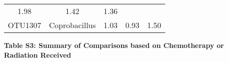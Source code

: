 \documentclass[12pt,]{article}
\begin{document}
\begin{longtable}[]{@{}ccccc@{}}
\begin{minipage}[t]{0.17\columnwidth}
1.98\strut
\end{minipage} & \begin{minipage}[t]{0.25\columnwidth}\centering\strut
1.42\strut
\end{minipage} & \begin{minipage}[t]{0.19\columnwidth}\centering\strut
1.36\strut
\end{minipage}\tabularnewline
\begin{minipage}[t]{0.07\columnwidth}\centering\strut
OTU1307\strut
\end{minipage} & \begin{minipage}[t]{0.18\columnwidth}\centering\strut
Coprobacillus\strut
\end{minipage} & \begin{minipage}[t]{0.17\columnwidth}\centering\strut
1.03\strut
\end{minipage} & \begin{minipage}[t]{0.25\columnwidth}\centering\strut
0.93\strut
\end{minipage} & \begin{minipage}[t]{0.19\columnwidth}\centering\strut
1.50\strut
\end{minipage}\tabularnewline
\bottomrule
\end{longtable}

\newpage

\textbf{Table S3: Summary of Comparisons based on Chemotherapy or
Radiation Received}
\end{document}
